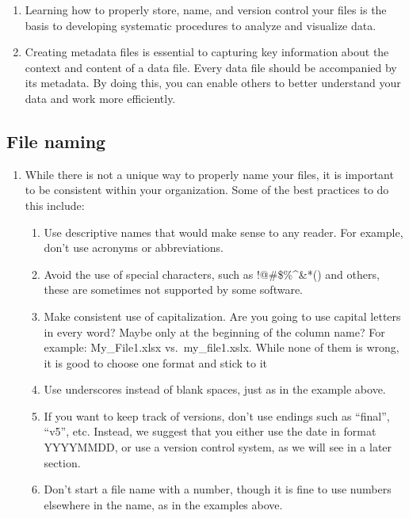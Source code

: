 \documentclass[
]{book}
\providecommand{\tightlist}{%
  \setlength{\itemsep}{0pt}\setlength{\parskip}{0pt}}
\begin{document}
\begin{enumerate}
\def\labelenumi{\arabic{enumi}.}
\item
  Learning how to properly store, name, and version control your files is the basis to developing systematic procedures to analyze and visualize data.
\item
  Creating metadata files is essential to capturing key information about the context and content of a data file. Every data file should be accompanied by its metadata. By doing this, you can enable others to better understand your data and work more efficiently.
\end{enumerate}

\hypertarget{file-naming}{%
\subsection{File naming}\label{file-naming}}

\begin{enumerate}
\def\labelenumi{\arabic{enumi}.}
\tightlist
\item
  While there is not a unique way to properly name your files, it is important to be consistent within your organization. Some of the best practices to do this include:

  \begin{enumerate}
  \def\labelenumii{\arabic{enumii}.}
  \tightlist
  \item
    Use descriptive names that would make sense to any reader. For example, don't use acronyms or abbreviations.
  \item
    Avoid the use of special characters, such as !@\#\$\%\^{}\&*() and others, these are sometimes not supported by some software.
  \item
    Make consistent use of capitalization. Are you going to use capital letters in every word? Maybe only at the beginning of the column name? For example: My\_File1.xlsx vs.~my\_file1.xslx. While none of them is wrong, it is good to choose one format and stick to it
  \item
    Use underscores instead of blank spaces, just as in the example above.
  \item
    If you want to keep track of versions, don't use endings such as ``final'', ``v5'', etc. Instead, we suggest that you either use the date in format YYYYMMDD, or use a version control system, as we will see in a later section.
  \item
    Don't start a file name with a number, though it is fine to use numbers elsewhere in the name, as in the examples above.
  \end{enumerate}
\end{enumerate}
\end{document}

